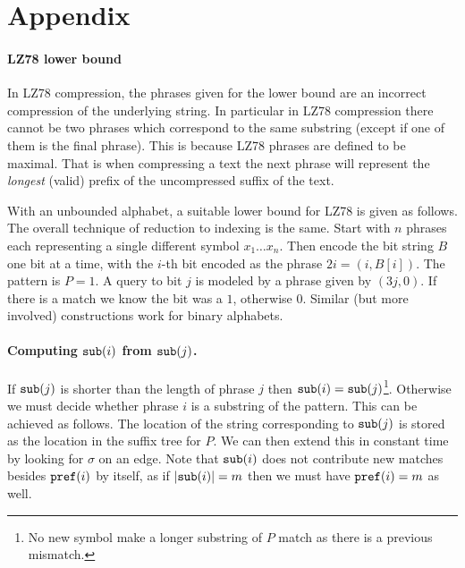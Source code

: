 \section*{Appendix}

\paragraph{LZ78 lower bound} In LZ78 compression, the phrases given for the lower bound are an incorrect compression of the underlying string. In particular in LZ78 compression there cannot be two phrases which correspond to the same substring (except if one of them is the final phrase). This is because LZ78 phrases are defined to be maximal. That is when compressing a text the next phrase will represent the \emph{longest} (valid) prefix of the uncompressed suffix of the text.

With an unbounded alphabet, a suitable lower bound for LZ78 is given as follows. The overall technique of reduction to indexing is the same. Start with $n$ phrases each representing a single different symbol $x_1 \ldots x_n$. Then encode the bit string $B$ one bit at a time, with the $i$-th bit encoded as the phrase $2i=(i,B[i])$. The pattern is $P=1$. A query to bit $j$ is modeled by a phrase given by $(3j,0)$. If there is a match we know the bit was a $1$, otherwise $0$. Similar (but more involved) constructions work for binary alphabets.

\paragraph{Computing $\mathtt{sub}(i)$ from $\mathtt{sub}(j)$.} If $\mathtt{sub}(j)$ is shorter than the length of phrase $j$ then $\mathtt{sub}(i) = \mathtt{sub}(j)$\footnote{No new symbol make a longer substring of $P$ match as there is a previous mismatch.}. Otherwise we must decide whether phrase $i$ is a substring of the pattern. This can be achieved as follows. The location of the string corresponding to $\mathtt{sub}(j)$ is stored as the location in the suffix tree for $P$. We can then extend this in constant time by looking for $\sigma$ on an edge.
    Note that $\mathtt{sub}(i)$ does not contribute new matches besides $\mathtt{pref}(i)$ by itself, as if $|\mathtt{sub}(i)| = m$ then we must have $\mathtt{pref}(i) = m$ as well.

